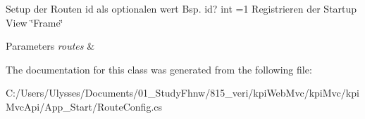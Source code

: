Setup der Routen id als optionalen wert Bsp. id? int =1 Registrieren der Startup View \char`\"{}\+Frame\char`\"{} 


\begin{DoxyParams}{Parameters}
{\em routes} & \\
\hline
\end{DoxyParams}


The documentation for this class was generated from the following file\+:\begin{DoxyCompactItemize}
\item 
C\+:/\+Users/\+Ulysses/\+Documents/01\+\_\+\+Study\+Fhnw/815\+\_\+veri/kpi\+Web\+Mvc/kpi\+Mvc/kpi\+Mvc\+Api/\+App\+\_\+\+Start/Route\+Config.\+cs\end{DoxyCompactItemize}
